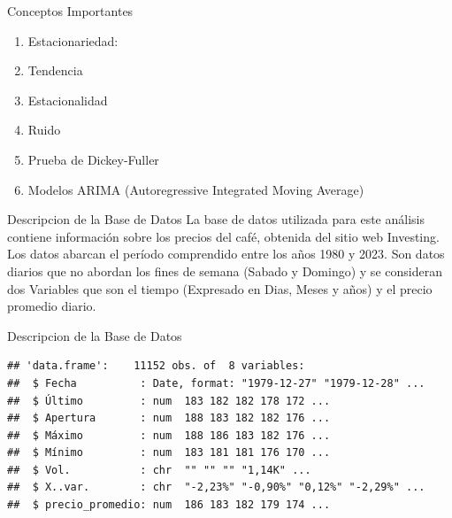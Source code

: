 \documentclass[
  10pt,
  ignorenonframetext,
  aspectratio=1612]{beamer}
\begin{document}
\begin{frame}{Conceptos Importantes}
\label{conceptos-importantes}
\begin{enumerate}

  \item Estacionariedad:
  
  \item Tendencia
  
  \item Estacionalidad
  
  \item Ruido
  
  \item Prueba de Dickey-Fuller
  
  \item Modelos ARIMA (Autoregressive Integrated Moving Average)
  
  
\end{enumerate}
\end{frame}

\begin{frame}{Descripcion de la Base de Datos}
\label{descripcion-de-la-base-de-datos}
La base de datos utilizada para este análisis contiene información sobre
los precios del café, obtenida del sitio web Investing. Los datos
abarcan el período comprendido entre los años 1980 y 2023. Son datos
diarios que no abordan los fines de semana (Sabado y Domingo) y se
consideran dos Variables que son el tiempo (Expresado en Dias, Meses y
años) y el precio promedio diario.
\end{frame}

\begin{frame}[fragile]{Descripcion de la Base de Datos}
\label{descripcion-de-la-base-de-datos-1}
\begin{verbatim}
## 'data.frame':    11152 obs. of  8 variables:
##  $ Fecha          : Date, format: "1979-12-27" "1979-12-28" ...
##  $ Último         : num  183 182 182 178 172 ...
##  $ Apertura       : num  188 183 182 182 176 ...
##  $ Máximo         : num  188 186 183 182 176 ...
##  $ Mínimo         : num  183 181 181 176 170 ...
##  $ Vol.           : chr  "" "" "" "1,14K" ...
##  $ X..var.        : chr  "-2,23%" "-0,90%" "0,12%" "-2,29%" ...
##  $ precio_promedio: num  186 183 182 179 174 ...
\end{verbatim}
\end{frame}
\end{document}
